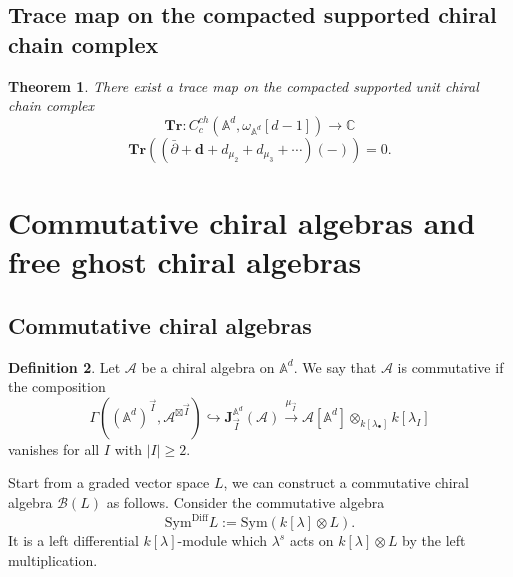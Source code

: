 \documentclass[11pt]{amsart}
\newtheorem{thm}{Theorem}[section]
\theoremstyle{definition}
\newtheorem{defn}[thm]{Definition}
\theoremstyle{remark}
\numberwithin{equation}{section}
\begin{document}
\subsection{Trace map on the compacted supported chiral chain complex}

\begin{thm}
    There exist a trace map on the compacted supported unit chiral chain complex
    $$
    \mathbf{Tr}:C^{ch}_c(\mathbb{A}^d,\omega_{\mathbb{A}^d}[d-1])\rightarrow\mathbb{C}
    $$
    $$
    \mathbf{Tr}\left((\bar{\partial}+\mathbf{d}+d_{\mu_2}+d_{\mu_3}+\cdots)(-)\right)=0.
    $$
\end{thm}

\fi
\section{Commutative chiral algebras and free ghost chiral algebras}
\subsection{Commutative chiral algebras}
\begin{defn}
   Let $\mathcal{A}$ be a chiral algebra on $\mathbb{A}^d$. We say that $\mathcal{A}$ is commutative if the composition
$$
\Gamma\left((\mathbb{A}^d)^{\vec{I}},\mathcal{A}^{\boxtimes \vec{I}}\right)\hookrightarrow \mathbf{J}_{\vec{I}}^{\mathbb{A}^d}(\mathcal{A})\xrightarrow{\mu_{\vec{I}}}\mathcal{A}[\mathbb{A}^d]\otimes_{k[\lambda_{\bullet}]}k[\lambda_I]
$$
    vanishes for all $I$ with $|I|\geq 2$.
\end{defn}


Start from a graded vector space $L$, we can construct a commutative chiral algebra $\mathcal{B}(L)$ as follows. Consider the commutative algebra
$$
\mathrm{Sym}^{\mathrm{Diff}}L:=\mathrm{Sym}(k[\lambda]\otimes L).
$$
It is a left differential $k[\lambda]$-module which $\lambda^s$ acts on $k[\lambda]\otimes L$ by the left multiplication.
\end{document}
